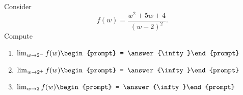 \documentclass{ximera}
\author{Bart Snapp}
\begin{document}
\begin{exercise}
Consider 
\[
f(w) = \frac{w^2+5 w+4}{(w-2)^2}.
\]
Compute
\begin{enumerate}
\item $\lim_{w\to 2^- } f(w) \begin{prompt} = \answer{\infty}\end{prompt}$
\item $\lim_{w\to 2^+ } f(w) \begin{prompt} = \answer{\infty}\end{prompt}$
\item $\lim_{w\to 2 } f(w) \begin{prompt} = \answer{\infty}\end{prompt}$
\end{enumerate}
\end{exercise}
\end{document}
